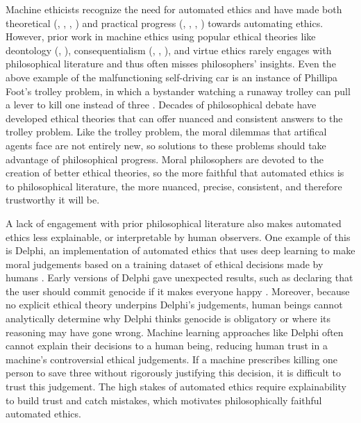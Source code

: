 \begin{isabellebody}
\begin{isamarkuptext}
Machine ethicists recognize the need for automated ethics and have made both theoretical 
(\citep{moralmachine}, \citep{davenport}, \citep{moralmachineonline}, \citep{gabriel}) and practical progress 
(\citep{logicprogramming}, \citep{biology}, \citep{winfield}, \citep{delphi}) towards automating ethics. 
However, prior work in machine ethics using popular ethical theories like deontology (\citep{deon1}, \citep{deon2}), 
consequentialism (\citep{util2}, \citep{cloos}, \citep{util1}), and virtue ethics \citep{virtue2} rarely 
engages with philosophical literature and thus often misses philosophers' insights. Even the above example of 
the malfunctioning self-driving car is an instance of Phillipa Foot's trolley problem, 
in which a bystander watching a runaway trolley can pull a lever to kill one instead of three \citep{foot}. 
Decades of philosophical debate have developed ethical theories that can offer nuanced and 
consistent answers to the trolley problem. Like the trolley problem, the moral dilemmas 
that artifical agents face are not entirely new, so solutions to these problems should take advantage of philosophical 
progress. Moral philosophers are devoted to the creation of better ethical theories, so the 
more faithful that automated ethics is to philosophical literature, the more nuanced, precise, consistent, and
therefore trustworthy it will be.

A lack of engagement with prior philosophical literature also makes automated ethics less 
explainable, or interpretable by human observers. One example of this is Delphi, an implementation of automated ethics that uses deep 
learning to make moral judgements based on a training dataset of ethical decisions made by humans \citep{delphi}. 
Early versions of Delphi gave unexpected results, such as declaring that the user should commit 
genocide if it makes everyone happy \citep{verge}. Moreover, because no explicit ethical theory underpins 
Delphi's judgements, human beings cannot analytically determine why Delphi thinks genocide is obligatory
or where its reasoning may have gone wrong. 
Machine learning approaches like Delphi often cannot explain their decisions to a human being, reducing
human trust in a machine's controversial ethical judgements. If a machine prescribes killing one person 
to save three without rigorously justifying this decision, it is difficult to trust this judgement. 
The high stakes of automated ethics require explainability to build trust and catch mistakes, which
motivates philosophically faithful automated ethics.


\end{isamarkuptext}
\end{isabellebody}
